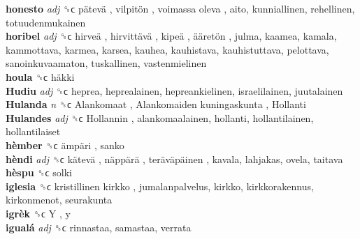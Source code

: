 \textbf{honesto} \emph{adj}  ␝ϲ   pätevä ,  vilpitön ,  voimassa oleva , aito, kunniallinen, rehellinen, totuudenmukainen  \\
\textbf{horibel} \emph{adj}  ␝ϲ   hirveä ,  hirvittävä ,  kipeä ,  ääretön , julma, kaamea, kamala, kammottava, karmea, karsea, kauhea, kauhistava, kauhistuttava, pelottava, sanoinkuvaamaton, tuskallinen, vastenmielinen  \\
\textbf{houla} ␝ϲ   häkki   \\
\textbf{Hudiu} \emph{adj}  ␝ϲ  heprea, heprealainen, hepreankielinen, israelilainen, juutalainen  \\
\textbf{Hulanda} \emph{n}  ␝ϲ   Alankomaat ,  Alankomaiden kuningaskunta ,  Hollanti   \\
\textbf{Hulandes} \emph{adj}  ␝ϲ   Hollannin , alankomaalainen, hollanti, hollantilainen, hollantilaiset  \\
\textbf{hèmber} ␝ϲ   ämpäri , sanko  \\
\textbf{hèndi} \emph{adj}  ␝ϲ   kätevä ,  näppärä ,  teräväpäinen , kavala, lahjakas, ovela, taitava  \\
\textbf{hèspu} ␝ϲ  solki  \\
\textbf{iglesia} ␝ϲ   kristillinen kirkko , jumalanpalvelus, kirkko, kirkkorakennus, kirkonmenot, seurakunta  \\
\textbf{igrèk} ␝ϲ   Y , y  \\
\textbf{igualá} \emph{adj}  ␝ϲ  rinnastaa, samastaa, verrata  \\
